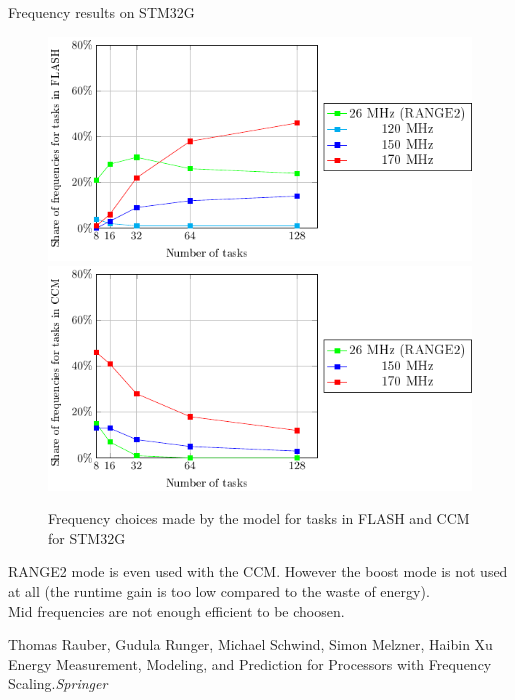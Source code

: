 \documentclass[
	11pt, %
]{beamer}
\begin{document}
\begin{frame}{Frequency results on STM32G}
	\begin{figure}
        \includegraphics[scale = 0.6]{data/model/f_choose_32g_flash.pdf}
		\includegraphics[scale = 0.6]{data/model/f_choose_32g_ccm.pdf}
		\caption{Frequency choices made by the model for tasks in FLASH and CCM for STM32G}
	\end{figure}
RANGE2 mode is even used with the CCM. 
However the boost mode is not used at all (the runtime gain is too low compared to the waste of energy).\\
Mid frequencies are not enough efficient to be choosen. \\
\begin{thebibliography}{10}
	{\tiny
	\bibitem{}Thomas Rauber, Gudula Runger, Michael Schwind, Simon Melzner, Haibin Xu
	\newblock Energy Measurement, Modeling, and Prediction for Processors with Frequency Scaling.{\em{Springer}}
	}
\end{thebibliography}

\end{frame}
\end{document}
